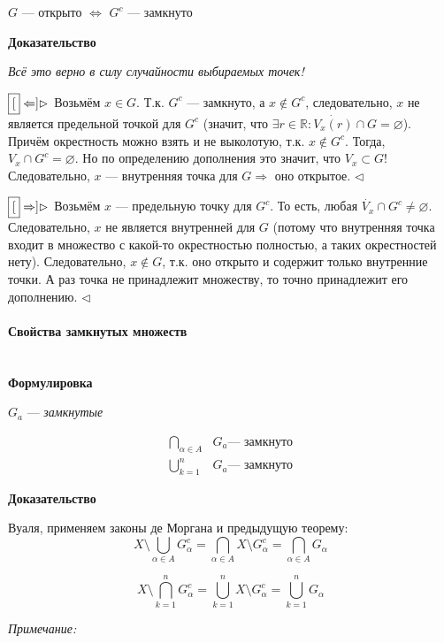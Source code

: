 \documentclass{article}
\let\vanillaparagraph\paragraph
\renewcommand{\paragraph}[1]{\vanillaparagraph{#1}\mbox{}\\}
\begin{document}
$G$ --- открыто $\Leftrightarrow$ $G^c$ --- замкнуто

\textbf{Доказательство}

\textit{Всё это верно в силу случайности выбираемых точек!}

$\fbox[\Leftarrow] \rhd$ Возьмём $x \in G$. Т.к. $G^c$ --- замкнуто, а $x \notin G^c$, следовательно, $x$ не является предельной точкой для $G^c$ (значит, что $\exists r \in \mathbb{R} : \dot{V_x(r)} \cap G = \varnothing$). Причём окрестность можно взять и не выколотую, т.к.  $x \notin G^c$. Тогда, $V_x \cap G^c = \varnothing$. Но по определению дополнения это значит, что $V_x \subset G$! Следовательно, $x$ --- внутренняя точка для $G \Rightarrow$ оно открытое. $\lhd$

$\fbox[\Rightarrow] \rhd$ Возьмём $x$ --- предельную точку для $G^c$. То есть, любая $\dot{V_x} \cap G^c \neq \varnothing$. Следовательно, $x$ не является внутренней для $G$ (потому что внутренняя точка входит в множество с какой-то окрестностью полностью, а таких окрестностей нету). Следовательно, $x \notin G$, т.к. оно открыто и содержит только внутренние точки. А раз точка не принадлежит множеству, то точно принадлежит его дополнению. $\lhd$

\paragraph{Свойства замкнутых множеств}
\textbf{Формулировка}

$G_a$ --- \textit{замкнутые}

\begin{align}
    \bigcap_{\alpha \in A}&{G_a} \textit{--- замкнуто}\\
    \bigcup_{k=1}^{n}&{G_a} \textit{--- замкнуто}
\end{align}

\textbf{Доказательство}

Вуаля, применяем законы де Моргана и предыдущую теорему:
\begin{equation*}
X \setminus \bigcup_{\alpha \in A}{G_\alpha^c} = \bigcap_{\alpha \in A}{X \setminus G_\alpha^c} = \bigcap_{\alpha \in A}{G_\alpha}
\end{equation*} 

\begin{equation*}
X \setminus \bigcap_{k=1}^{n}{G_\alpha^c} = \bigcup_{k=1}^{n}{X \setminus G_\alpha^c} = \bigcup_{k=1}^{n}{G_\alpha}
\end{equation*} 

\textit{Примечание:}
\end{document}
